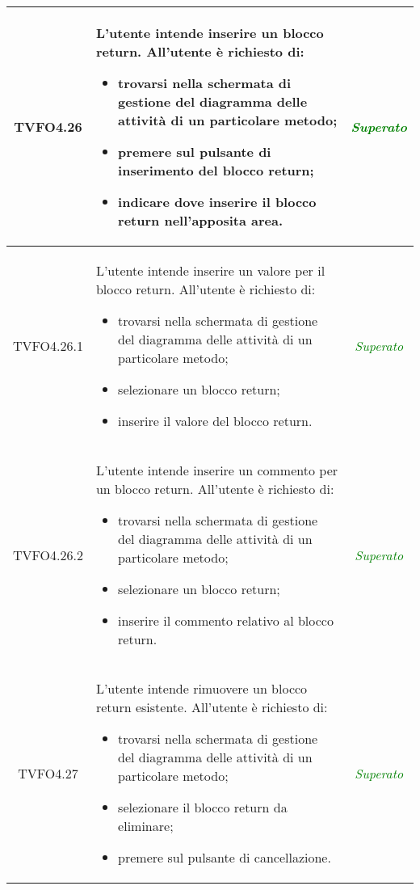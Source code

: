 \begin{longtable}{|c|>{}m{8cm}|c|}
\hypertarget{TVFO4.26}{TVFO4.26} & L'utente intende inserire un blocco return.
All'utente è richiesto di:
\begin{itemize}
	\item trovarsi nella schermata di gestione del diagramma delle attività di un particolare metodo;
	\item premere sul pulsante di inserimento del blocco return;
	\item indicare dove inserire il blocco return nell'apposita area.
\end{itemize} & \textcolor{Green}{\textit{Superato}}\\ \hline

\hypertarget{TVFO4.26.1}{TVFO4.26.1} & L'utente intende inserire un valore per il blocco return.
All'utente è richiesto di:
\begin{itemize}
	\item trovarsi nella schermata di gestione del diagramma delle attività di un particolare metodo;
	\item selezionare un blocco return;
	\item inserire il valore del blocco return.
\end{itemize} & \textcolor{Green}{\textit{Superato}}\\ \hline

\hypertarget{TVFO4.26.2}{TVFO4.26.2} & L'utente intende inserire un commento per un blocco return.
All'utente è richiesto di:
\begin{itemize}
	\item trovarsi nella schermata di gestione del diagramma delle attività di un particolare metodo;
	\item selezionare un blocco return;
	\item inserire il commento relativo al blocco return.
\end{itemize} & \textcolor{Green}{\textit{Superato}}\\ \hline

\hypertarget{TVFO4.27}{TVFO4.27} & L'utente intende rimuovere un blocco return esistente.
All'utente è richiesto di:
\begin{itemize}
	\item trovarsi nella schermata di gestione del diagramma delle attività di un particolare metodo;
	\item selezionare il blocco return da eliminare;
	\item premere sul pulsante di cancellazione.
\end{itemize} & \textcolor{Green}{\textit{Superato}}\\ \hline


\end{longtable}
